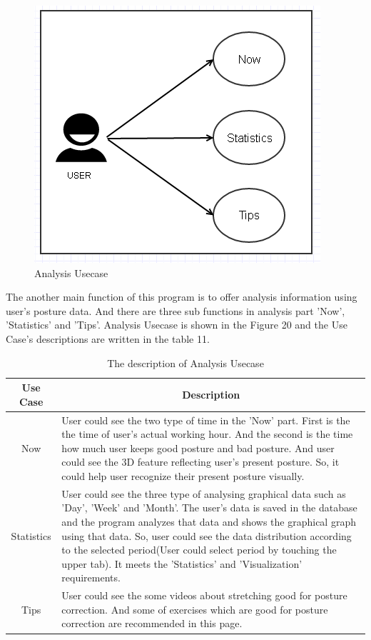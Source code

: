 \documentclass[conference]{IEEEtran}
\begin{document}
\begin{figure}[H]
\begin{center}
    \includegraphics[scale=0.8]{img_21.png}
    \caption{Analysis Usecase} 
\end{center}
\end{figure}
               

 The another main function of this program is to offer analysis information using user's posture data. And there are three sub functions in analysis part 'Now', 'Statistics' and 'Tips'. Analysis Usecase is shown in the Figure 20 and the Use Case's descriptions are written in the table 11. 

\begin{table}[h]
{\renewcommand\arraystretch{1.25}
\caption{The description of Analysis Usecase}
\begin{tabular}{|c|l|l|} \hline
Use Case & \multicolumn{2}{c|}{Description} \\ \hline\hline
Now & \multicolumn{2}{p{6cm}|}{\raggedright User could see the two type of time in the 'Now' part. First is the the time of user's actual working hour. And the second is the time how much user keeps good posture and bad posture. And user could see the 3D feature reflecting user's present posture. So, it could help user recognize their present posture visually.} \\ \hline
Statistics & \multicolumn{2}{p{6cm}|}{\raggedright User could see the three type of analysing graphical data such as 'Day', 'Week' and 'Month'. The user's data is saved in the database and the program analyzes that data and shows the graphical graph using that data. So, user could see the data distribution according to the selected period(User could select period by touching the upper tab).  It meets the 'Statistics' and 'Visualization' requirements.} \\ \hline
Tips & \multicolumn{2}{p{6cm}|}{\raggedright User could see the some videos about stretching good for posture correction. And some of exercises which are good for posture correction  are recommended in this page.} \\ \hline
\end{tabular}}
\end{table}
\end{document}
